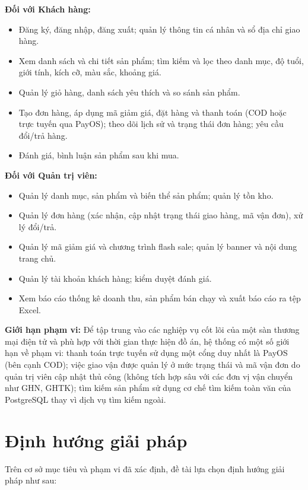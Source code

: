 \textbf{Đối với Khách hàng:}
\begin{itemize}
  \item Đăng ký, đăng nhập, đăng xuất; quản lý thông tin cá nhân và sổ địa chỉ giao hàng.
  \item Xem danh sách và chi tiết sản phẩm; tìm kiếm và lọc theo danh mục, độ tuổi, giới tính,
  kích cỡ, màu sắc, khoảng giá.
  \item Quản lý giỏ hàng, danh sách yêu thích và so sánh sản phẩm.
  \item Tạo đơn hàng, áp dụng mã giảm giá, đặt hàng và thanh toán (COD hoặc trực tuyến qua
  PayOS); theo dõi lịch sử và trạng thái đơn hàng; yêu cầu đổi/trả hàng.
  \item Đánh giá, bình luận sản phẩm sau khi mua.
\end{itemize}

\textbf{Đối với Quản trị viên:}
\begin{itemize}
  \item Quản lý danh mục, sản phẩm và biến thể sản phẩm; quản lý tồn kho.
  \item Quản lý đơn hàng (xác nhận, cập nhật trạng thái giao hàng, mã vận đơn), xử lý đổi/trả.
  \item Quản lý mã giảm giá và chương trình flash sale; quản lý banner và nội dung trang chủ.
  \item Quản lý tài khoản khách hàng; kiểm duyệt đánh giá.
  \item Xem báo cáo thống kê doanh thu, sản phẩm bán chạy và xuất báo cáo ra tệp Excel.
\end{itemize}

\textbf{Giới hạn phạm vi:} Để tập trung vào các nghiệp vụ cốt lõi của một sàn thương mại điện
tử và phù hợp với thời gian thực hiện đồ án, hệ thống có một số giới hạn về phạm vi: thanh toán
trực tuyến sử dụng một cổng duy nhất là PayOS (bên cạnh COD); việc giao vận được quản lý ở
mức trạng thái và mã vận đơn do quản trị viên cập nhật thủ công (không tích hợp sâu với các đơn
vị vận chuyển như GHN, GHTK); tìm kiếm sản phẩm sử dụng cơ chế tìm kiếm toàn văn của
PostgreSQL thay vì dịch vụ tìm kiếm ngoài.

\section{Định hướng giải pháp}

Trên cơ sở mục tiêu và phạm vi đã xác định, đề tài lựa chọn định hướng giải pháp như sau:

